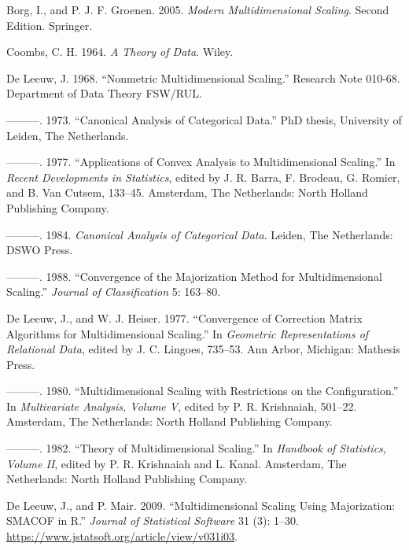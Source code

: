 \documentclass[
  12pt,
]{book}
\newlength{\cslhangindent}
\newenvironment{CSLReferences}[2] %
 {\begin{list}{}{%
  \setlength{\itemindent}{0pt}
  \setlength{\leftmargin}{0pt}
  \setlength{\parsep}{0pt}
  \ifodd #1
   \setlength{\leftmargin}{\cslhangindent}
   \setlength{\itemindent}{-1\cslhangindent}
  \fi
  \setlength{\itemsep}{#2\baselineskip}}}
 {\end{list}}
\begin{document}
\label{refs}
\begin{CSLReferences}{1}{0}
Borg, I., and P. J. F. Groenen. 2005. \emph{Modern Multidimensional Scaling}. Second Edition. Springer.

Coombs, C. H. 1964. \emph{{A Theory of Data}}. Wiley.

De Leeuw, J. 1968. {``Nonmetric Multidimensional Scaling.''} Research Note 010-68. Department of Data Theory FSW/RUL.

---------. 1973. {``Canonical Analysis of Categorical Data.''} PhD thesis, University of Leiden, The Netherlands.

---------. 1977. {``Applications of Convex Analysis to Multidimensional Scaling.''} In \emph{Recent Developments in Statistics}, edited by J. R. Barra, F. Brodeau, G. Romier, and B. Van Cutsem, 133--45. Amsterdam, The Netherlands: North Holland Publishing Company.

---------. 1984. \emph{Canonical Analysis of Categorical Data}. Leiden, The Netherlands: DSWO Press.

---------. 1988. {``Convergence of the Majorization Method for Multidimensional Scaling.''} \emph{Journal of Classification} 5: 163--80.

De Leeuw, J., and W. J. Heiser. 1977. {``Convergence of Correction Matrix Algorithms for Multidimensional Scaling.''} In \emph{Geometric Representations of Relational Data}, edited by J. C. Lingoes, 735--53. Ann Arbor, Michigan: Mathesis Press.

---------. 1980. {``Multidimensional Scaling with Restrictions on the Configuration.''} In \emph{Multivariate Analysis, Volume {V}}, edited by P. R. Krishnaiah, 501--22. Amsterdam, The Netherlands: North Holland Publishing Company.

---------. 1982. {``Theory of Multidimensional Scaling.''} In \emph{Handbook of Statistics, Volume {II}}, edited by P. R. Krishnaiah and L. Kanal. Amsterdam, The Netherlands: North Holland Publishing Company.

De Leeuw, J., and P. Mair. 2009. {``{Multidimensional Scaling Using Majorization: SMACOF in R}.''} \emph{Journal of Statistical Software} 31 (3): 1--30. \url{https://www.jstatsoft.org/article/view/v031i03}.


\end{CSLReferences}
\end{document}
